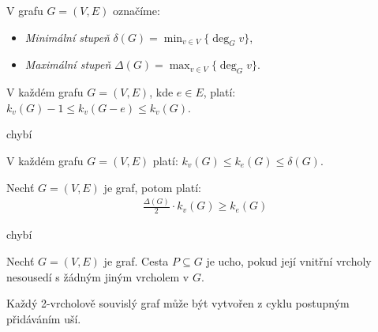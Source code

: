 \begin{t_definition}
  V grafu $G=(V,E)$ označíme:
  \begin{itemize}
    \item \textit{Minimální stupeň} $\delta(G)=\min_{v\in V}\{\deg_G v\}$,
    \item \textit{Maximální stupeň} $\Delta(G)=\max_{v\in V}\{\deg_G v\}$.
  \end{itemize}
\end{t_definition}

\begin{t_theorem}
  V každém grafu $G=(V,E)$, kde $e\in E$, platí: $k_v(G)-1\leq k_v(G-e)\leq k_v(G)$.
\end{t_theorem}

\begin{t_proof}
  chybí %
\end{t_proof}

\begin{t_corollary}
  V každém grafu $G=(V,E)$ platí: $k_v(G)\leq k_e(G)\leq \delta(G)$.
\end{t_corollary}

\begin{t_lemma}
  Nechť $G=(V,E)$ je graf, potom platí:
  \begin{align*}
    \frac{\Delta(G)}{2}\cdot k_v(G) \geq k_e(G)
  \end{align*}
\end{t_lemma}

\begin{t_proof}
  chybí %
\end{t_proof}

\begin{t_definition}
  Nechť $G=(V,E)$ je graf. Cesta $P\subseteq G$ je ucho, pokud její vnitřní vrcholy nesousedí s žádným jiným vrcholem v $G$.
\end{t_definition}

\begin{t_lemma}[ušaté]
  Každý 2-vrcholově souvislý graf může být vytvořen z cyklu postupným přidáváním uší.
\end{t_lemma}

